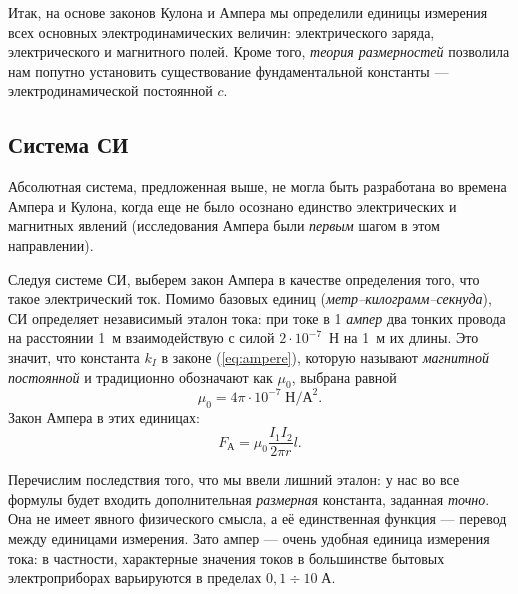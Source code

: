 Итак, на основе законов Кулона и Ампера мы определили единицы измерения
всех основных электродинамических величин: электрического заряда,
электрического и магнитного полей. Кроме того, \emph{теория размерностей}
позволила нам попутно установить существование фундаментальной константы
--- электродинамической постоянной $c$.

\subsection*{Система СИ}

Абсолютная система, предложенная выше, не могла быть разработана во
времена Ампера и Кулона, когда еще не было осознано единство электрических
и магнитных явлений (исследования Ампера были \emph{первым} шагом
в этом направлении).

Следуя системе СИ, выберем закон Ампера в качестве определения того,
что такое электрический ток. Помимо базовых единиц (\emph{метр--килограмм--секнуда}),
СИ определяет независимый эталон тока: при токе в 1 \emph{ампер} два
тонких провода на расстоянии 1~м взаимодействую с силой $2\cdot10^{-7}$~Н
на 1~м их длины. Это значит, что константа $k_{I}$ в законе (\ref{eq:ampere}),
которую называют \emph{магнитной постоянной} и традиционно обозначают
как $\mu_{0}$, выбрана равной
\[
\mu_{0}=4\pi\cdot10^{-7}\;\text{Н}/\text{А}^{2}.
\]
Закон Ампера в этих единицах:
\begin{equation}
F_{\text{А}}=\mu_{0}\frac{I_{1}I_{2}}{2\pi r}l.
\end{equation}

Перечислим последствия того, что мы ввели лишний эталон: у нас во
все  формулы будет входить
дополнительная \emph{размерна}я константа, заданная \emph{точно}.
Она не имеет явного физического смысла, а её единственная функция
--- перевод между единицами измерения. Зато ампер --- очень удобная
единица измерения тока: в частности, характерные значения токов в
большинстве бытовых электроприборах варьируются в пределах $0{,}1\div10\;\text{А}$.

